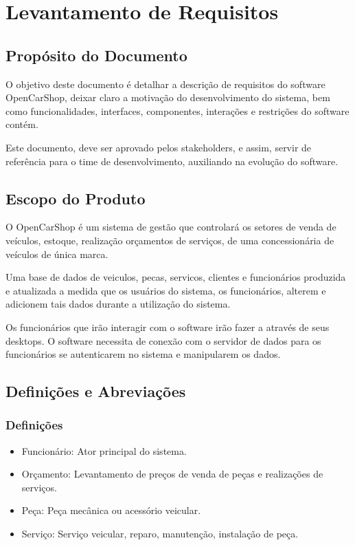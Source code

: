\section{Levantamento de Requisitos}\label{requisitos}

\subsection{Propósito do Documento}
\par
O objetivo deste documento é detalhar a descrição de requisitos do software OpenCarShop, deixar claro a motivação do desenvolvimento do sistema, bem como funcionalidades, interfaces, componentes, interações e restrições do software contém. 
\par
Este documento, deve ser aprovado pelos stakeholders, e assim, servir de referência para o time de desenvolvimento, auxiliando na evolução do software.



\subsection{Escopo do Produto}
\par
O OpenCarShop é um sistema de gestão que controlará os setores de venda de veículos, estoque, realização orçamentos de serviços, de uma concessionária de veículos de única marca. 
\par
Uma base de dados de veiculos, pecas, servicos, clientes e funcionários produzida e atualizada a medida que os usuários do sistema, os funcionários, alterem e adicionem tais dados durante a utilização do sistema.
\par
Os funcionários que irão interagir com o software irão fazer a através de seus desktops. O software necessita de conexão com o servidor de dados para os funcionários se autenticarem no sistema e manipularem os dados. 




\subsection{Definições e Abreviações}
	\subsubsection{Definições}
	
	\begin{itemize}
		\item Funcionário: Ator principal do sistema.
		\item Orçamento: Levantamento de preços de venda de peças e realizações de serviços.
		\item Peça: Peça mecânica ou acessório veicular.
		\item Serviço: Serviço veicular, reparo, manutenção, instalação de peça.
	\end{itemize}
	
